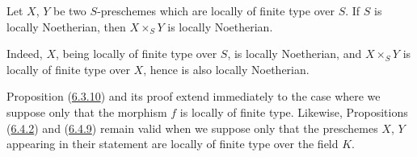 \begin{corollary}[6.6.7]
\label{I.6.6.7}
Let $X$, $Y$ be two $S$-preschemes which are locally of finite type over $S$.
If $S$ is locally Noetherian, then $X\times_S Y$ is locally Noetherian.
\end{corollary}

Indeed, $X$, being locally of finite type over $S$, is locally Noetherian, and
$X\times_S Y$ is locally of finite type over $X$, hence is also locally
Noetherian.

\begin{remark}[6.6.8]
\label{I.6.6.8}
Proposition (\hyperref[I.6.3.10]{6.3.10}) and its proof extend immediately
to the case where we suppose only that the morphism $f$ is locally of finite
type. Likewise, Propositions
(\hyperref[I.6.4.2]{6.4.2}) and (\hyperref[I.6.4.9]{6.4.9}) remain
valid when we suppose only that the preschemes $X$, $Y$ appearing in their
statement are locally of finite type over the field $K$.
\end{remark}
